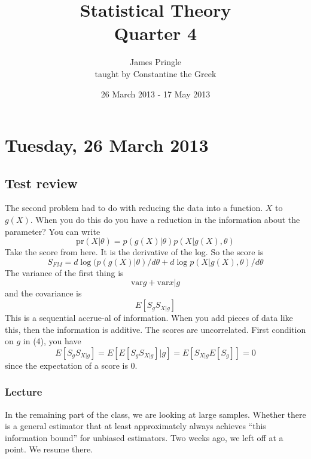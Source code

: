 \documentclass[letterpaper, 12pt]{article}
\theoremstyle{definition}
\theoremstyle{plain}
\newcommand{\pr}{\text{pr}}
\newcommand{\var}{\text{var}}
\begin{document}
\title{Statistical Theory \\ 
		 Quarter 4}
\author{James Pringle \\
taught by Constantine the Greek}
\date{26 March 2013 - 17 May 2013}
\maketitle

\section{Tuesday, 26 March 2013}
\subsection*{Test review}
The second problem had to do with reducing the data into a function. $X$ to $g(X)$. When you do this do you have a reduction in the information about the parameter? You can write
\begin{equation}
\pr(X | \theta) = p (g(X) | \theta) p (X | g(X) , \theta)
\end{equation}
Take the score from here. It is the derivative of the log. So the score is 
\begin{equation}
S_{FM} = d \log (p(g(X) | \theta) / d \theta + d \log p (X | g(X) , \theta) / d \theta
\end{equation}
The variance of the first thing is 
\begin{equation}
\var g + \var x | g
\end{equation}
and the covariance is 
\begin{equation}
E [ S_g S_{X|g}]
\end{equation}
This is a sequential accrue-al of information. When you add pieces of data like this, then the information is additive. The scores are uncorrelated. First condition on $g$ in (4), you have
\begin{equation}
E [ S_g S_{X|g}] = E[ E [ S_g S_{X|g}] | g  ] = E[ S_{X|g} E[S_g]  ] = 0
\end{equation}
since the expectation of a score is 0.
\subsubsection*{Lecture}
In the remaining part of the class, we are looking at large samples. Whether there is a general estimator that at least approximately always achieves ``this information bound'' for unbiased estimators.
Two weeks ago, we left off at a point. We resume there.
\end{document}
